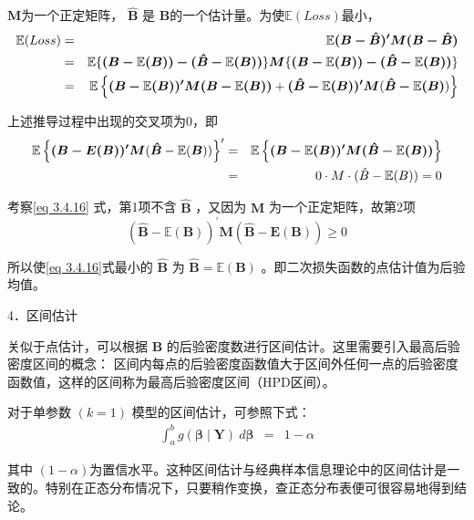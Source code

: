 		   $ \boldsymbol{M} $为一个正定矩阵， $ \boldsymbol{\hat{B}} $ 是  $ \boldsymbol{B} $的一个估计量。为使$ \mathbb{E} (Loss) $最小，
		   \begin{eqnarray}
			\mathbb{E}(Loss)  & = & \mathbb{E} \boldsymbol{(B-\hat{B})^{\prime} M(B-\hat{B})} \notag \\
		   & = & \mathbb{E}\{ \boldsymbol{(B-\mathbb{E}(B))-(\hat{B}-\mathbb{E}(B))} \} 
		   \boldsymbol{M}\{\boldsymbol{(B-\mathbb{E}(B))-(\hat{B}-\mathbb{E}(B))}\}  \label{eq 3.4.16}\\
		   & = & \mathbb{E}\left\{\boldsymbol{(B-\mathbb{E}(B))^{\prime}} \boldsymbol{M}\boldsymbol{(B-\mathbb{E}(B))}+
		   \boldsymbol{(\hat{B}-\mathbb{E}(B))^{\prime}} \boldsymbol{M}(\boldsymbol{\hat{B}-\mathbb{E}(B)})\right\} \notag
		   \end{eqnarray}
		   
		   上述推导过程中出现的交叉项为0，即
		   \begin{eqnarray}
			\mathbb{E}\left\{\boldsymbol{(B-E(B))^{\prime}} \boldsymbol{M}( \boldsymbol{\hat{B}}-\mathbb{E}( \boldsymbol{B}))\right\}^{\prime} 
		   &  = & \mathbb{E}\left\{\boldsymbol{(B-\mathbb{E}(B))^{\prime}} \boldsymbol{M}\boldsymbol{(\hat{B}-\mathbb{E}(B))}\right\} \notag  \\
		   & = & 0 \cdot M \cdot(\hat{B}-\mathbb{E}(B)) = 0  \notag
		   \end{eqnarray}
		   
		   考察\ref{eq 3.4.16} 式，第1项不含 $ \boldsymbol{\hat{B}} $ ，又因为 $ \boldsymbol{ M } $ 为一个正定矩阵，故第2项
		   $$ \boldsymbol{(\hat{B}-\mathbb{E}(B))^{\prime}} \boldsymbol{M}(\boldsymbol{\hat{B}-E(B)}) \geq 0 $$
		   
		   所以使\ref{eq 3.4.16}式最小的 $ \boldsymbol{\hat{B}} $  为 $ \boldsymbol{\hat{B} = \mathbb{E}(B)} $ 。即二次损失函数的点估计值为后验均值。
		   
		   
		   4．区间估计
		   
		   关似于点估计，可以根据 $ \boldsymbol{B} $ 的后验密度数进行区间估计。这里需要引入最高后验密度区间的概念：
		   区间内每点的后验密度函数值大于区间外任何一点的后验密度函数值，这样的区间称为最高后验密度区间（HPD区间）。
		   
		   对于单参数 $ (k = 1)  $ 模型的区间估计，可参照下式：
		   \begin{eqnarray}
		   \int_{a}^{b} g(\boldsymbol{\beta \mid Y}) ~ d \boldsymbol{\beta} & = & 1-\alpha
		   \end{eqnarray}
		   
		   其中 $ ( 1-\alpha) $为置信水平。这种区间估计与经典样本信息理论中的区间估计是一致的。特别在正态分布情况下，只要稍作变换，查正态分布表便可很容易地得到结论。
		   
